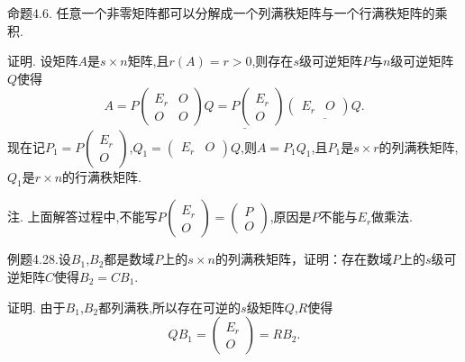 \documentclass{article}
\begin{document}
{\heiti 命题4.6.} {\kaishu 任意一个非零矩阵都可以分解成一个列满秩矩阵与一个行满秩矩阵的乘积.}

{\heiti 证明.} 设矩阵$A$是$s \times n$矩阵,且$r \left(A\right) = r > 0$,则存在$s$级可逆矩阵$P$与$n$级可逆矩阵$Q$使得
\begin{equation*}
    A=P\left(\begin{array}{cc}
            E_{r} & O \\
            O     & O
        \end{array}\right)
    \underline{Q=P\left(\begin{array}{c}
            E_{r} \\
            O
        \end{array}\right)}
    \underline{\left(\begin{array}{ll}
            E_{r} & O
        \end{array}\right) Q.}
\end{equation*}
现在记$P_1 = P \left(
    \begin{array}{c}
            E_r \\
            O
        \end{array}
    \right)$,$Q_1 = \left(
    \begin{array}{cc}
            E_r & O
        \end{array}
    \right)Q$,则$A = P_1Q_1$,且$P_1$是$s \times r$的列满秩矩阵,$Q_1$是$r \times n$的行满秩矩阵.

注. 上面解答过程中,不能写$P \left(
    \begin{array}{c}
            E_r \\
            O
        \end{array}
    \right)
    =
    \left(
    \begin{array}{c}
            P \\
            O
        \end{array}
    \right)$,原因是$P$不能与$E_r$做乘法.

{\heiti 例题4.28.}{\kaishu 设$B_1$,$B_2$都是数域$P$上的$s \times n$的列满秩矩阵，证明：存在数域$P$上的$s$级可逆矩阵$C$使得$B_2 = CB_1$.}

{\heiti 证明.} 由于$B_1$,$B_2$都列满秩,所以存在可逆的$s$级矩阵$Q$,$R$使得
\begin{equation*}
    Q B_{1}=\left(\begin{array}{c}
            E_{r} \\
            O
        \end{array}\right)=R B_{2}.
\end{equation*}
\end{document}
